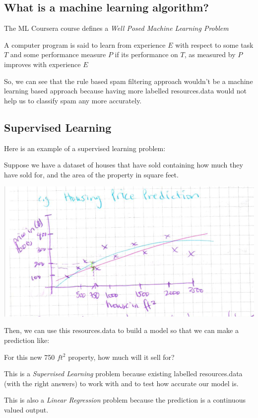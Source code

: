 \documentclass[12pt]{article}
\begin{document}
\subsection{What is a machine learning algorithm?}

The ML Coursera course defines a \textit{Well Posed Machine Learning Problem}

A computer program is said to learn from experience $E$ with respect to some task $T$ and some performance measure $P$ 
if its performance on $T$, as measured by $P$ improves with experience $E$

So, we can see that the rule based spam filtering approach wouldn't be a machine learning based approach because having 
more labelled resources.data would not help us to classify spam any more accurately.

\subsection{Supervised Learning}

Here is an example of a supervised learning problem: 

Suppose we have a dataset of houses that have sold containing how much they have sold for, and the area of the property in square feet. 

\includegraphics[width={\textwidth}]{housing-prices}

Then, we can use this resources.data to build a model so that we can make a prediction like:

For this new 750 $ft^2$ property, how much will it sell for?

This is a \textit{Supervised Learning} problem because existing labelled resources.data (with the right answers) to work with and to test how accurate our model is.

This is also a \textit{Linear Regression} problem because the prediction is a continuous valued output. 
\end{document}
